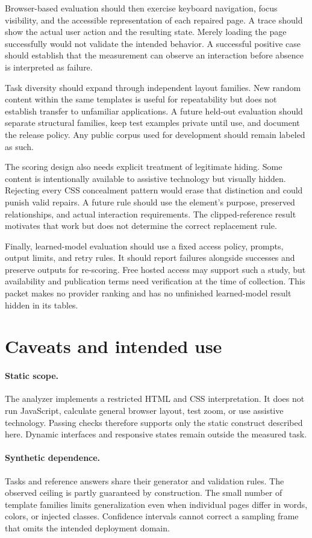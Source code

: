 \documentclass{article}
\begin{document}
Browser-based evaluation should then exercise keyboard navigation, focus visibility, and the accessible representation of each repaired page. A trace should show the actual user action and the resulting state. Merely loading the page successfully would not validate the intended behavior. A successful positive case should establish that the measurement can observe an interaction before absence is interpreted as failure.

Task diversity should expand through independent layout families. New random content within the same templates is useful for repeatability but does not establish transfer to unfamiliar applications. A future held-out evaluation should separate structural families, keep test examples private until use, and document the release policy. Any public corpus used for development should remain labeled as such.

The scoring design also needs explicit treatment of legitimate hiding. Some content is intentionally available to assistive technology but visually hidden. Rejecting every CSS concealment pattern would erase that distinction and could punish valid repairs. A future rule should use the element's purpose, preserved relationships, and actual interaction requirements. The clipped-reference result motivates that work but does not determine the correct replacement rule.

Finally, learned-model evaluation should use a fixed access policy, prompts, output limits, and retry rules. It should report failures alongside successes and preserve outputs for re-scoring. Free hosted access may support such a study, but availability and publication terms need verification at the time of collection. This packet makes no provider ranking and has no unfinished learned-model result hidden in its tables.


\section{Caveats and intended use}
\paragraph{Static scope.} The analyzer implements a restricted HTML and CSS interpretation. It does not run JavaScript, calculate general browser layout, test zoom, or use assistive technology. Passing checks therefore supports only the static construct described here. Dynamic interfaces and responsive states remain outside the measured task.
\paragraph{Synthetic dependence.} Tasks and reference answers share their generator and validation rules. The observed ceiling is partly guaranteed by construction. The small number of template families limits generalization even when individual pages differ in words, colors, or injected classes. Confidence intervals cannot correct a sampling frame that omits the intended deployment domain.
\end{document}
